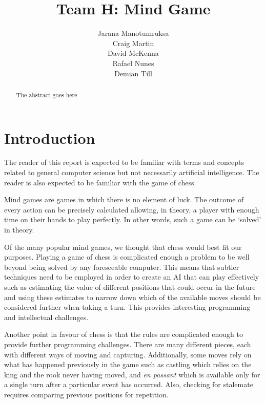 \documentclass{l3proj}
\begin{document}
\title{Team H: Mind Game}
\author{Jarana Manotumruksa\\
	Craig Martin \\
	David McKenna \\
	Rafael Nunes \\
	Demian Till \\
	}
\maketitle
\begin{abstract}

The abstract goes here

\end{abstract}
\educationalconsent
\tableofcontents
\chapter{Introduction}
\label{intro}

	The reader of this report is expected to be familiar with terms and concepts related to
general computer science but not necessarily artificial intelligence. The reader is also
expected to be familiar with the game of chess.

	Mind games are games in which there is no element of luck. The outcome of every action
can be precisely calculated allowing, in theory, a player with enough time on their hands to
play perfectly. In other words, such a game can be ‘solved’ in theory.

	Of the many popular mind games, we thought that chess would best fit our purposes.
Playing a game of chess is complicated enough a problem to be well beyond being solved
by any foreseeable computer. This means that subtler techniques need to be employed in
order to create an AI that can play effectively such as estimating the value of different
positions that could occur in the future and using these estimates to narrow down which of
the available moves should be considered further when taking a turn. This provides
interesting programming and intellectual challenges.

	Another point in favour of chess is that the rules are complicated enough to provide further
programming challenges. There are many different pieces, each with different ways of
moving and capturing. Additionally, some moves rely on what has happened previously in
the game such as castling which relies on the king and the rook never having moved, and
\emph{en passant} which is available only for a single turn after a particular event has occurred.
Also, checking for stalemate requires comparing previous positions for repetition.
\end{document}

